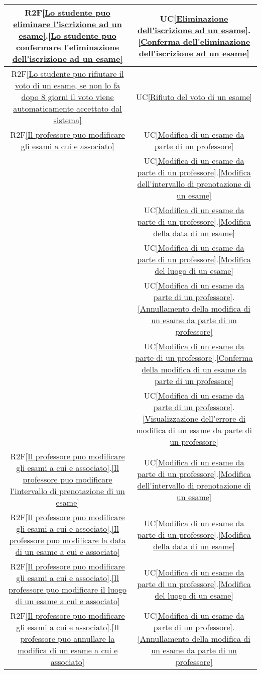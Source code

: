 \begin{longtable}{|c|c|}
\hline
R2F\ref{Lo studente puo eliminare l'iscrizione ad un esame}.\ref{Lo studente puo confermare l'eliminazione dell'iscrizione ad un esame} & UC\ref{Eliminazione dell'iscrizione ad un esame}.\ref{Conferma dell'eliminazione dell'iscrizione ad un esame}\\
\hline
R2F\ref{Lo studente puo rifiutare il voto di un esame, se non lo fa dopo 8 giorni il voto viene automaticamente accettato dal sistema} & UC\ref{Rifiuto del voto di un esame}\\
\hline
R2F\ref{Il professore puo modificare gli esami a cui e associato} & UC\ref{Modifica di un esame da parte di un professore}\\
& UC\ref{Modifica di un esame da parte di un professore}.\ref{Modifica dell'intervallo di prenotazione di un esame}\\
& UC\ref{Modifica di un esame da parte di un professore}.\ref{Modifica della data di un esame}\\
& UC\ref{Modifica di un esame da parte di un professore}.\ref{Modifica del luogo di un esame}\\
& UC\ref{Modifica di un esame da parte di un professore}.\ref{Annullamento della modifica di un esame da parte di un professore}\\
& UC\ref{Modifica di un esame da parte di un professore}.\ref{Conferma della modifica di un esame da parte di un professore}\\
&  UC\ref{Modifica di un esame da parte di un professore}.\ref{Visualizzazione dell'errore di modifica di un esame da parte di un professore}\\
\hline
R2F\ref{Il professore puo modificare gli esami a cui e associato}.\ref{Il professore puo modificare l'intervallo di prenotazione di un esame} & UC\ref{Modifica di un esame da parte di un professore}.\ref{Modifica dell'intervallo di prenotazione di un esame}\\
\hline
R2F\ref{Il professore puo modificare gli esami a cui e associato}.\ref{Il professore puo modificare la data di un esame a cui e associato} & UC\ref{Modifica di un esame da parte di un professore}.\ref{Modifica della data di un esame}\\
\hline
R2F\ref{Il professore puo modificare gli esami a cui e associato}.\ref{Il professore puo modificare il luogo di un esame a cui e associato} & UC\ref{Modifica di un esame da parte di un professore}.\ref{Modifica del luogo di un esame}\\
\hline
R2F\ref{Il professore puo modificare gli esami a cui e associato}.\ref{Il professore puo annullare la modifica di un esame a cui e associato} & UC\ref{Modifica di un esame da parte di un professore}.\ref{Annullamento della modifica di un esame da parte di un professore}\\

\end{longtable}
